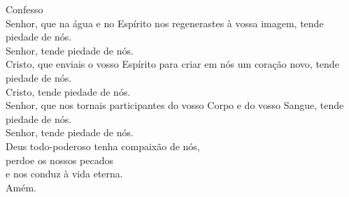 \textcolor{VioletRed1}{Confesso}
\vspace{0.2cm} \\
\VbarRed{} Senhor, que na água e no Espírito nos regenerastes à vossa imagem, tende piedade de nós.\\
\RbarRed{} Senhor, tende piedade de nós.
\vspace{0.1cm} \\
\VbarRed{} Cristo, que enviais o vosso Espírito para criar em nós um coração novo, tende piedade de nós.\\
\RbarRed{} Cristo, tende piedade de nós.
\vspace{0.1cm} \\
\VbarRed{} Senhor, que nos tornais participantes do vosso Corpo e do vosso Sangue, tende piedade de nós.\\
\RbarRed{} Senhor, tende piedade de nós.
\vspace{0.1cm} \\
Deus todo-poderoso tenha compaixão de nós, \\
perdoe os nossos pecados \\
e nos conduz à vida eterna. \\
\RbarRed{} Amém.
\vspace{0.2cm} \\
